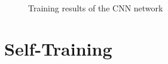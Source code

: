 \documentclass[11pt, a4paper]{report}
\begin{document}
\begin{figure}[!h]
	\begin{center}
		\\
	\end{center}
	\caption{Training results of the CNN network}
	\label{ocr-results}
\end{figure}

\section{Self-Training}
\end{document}
